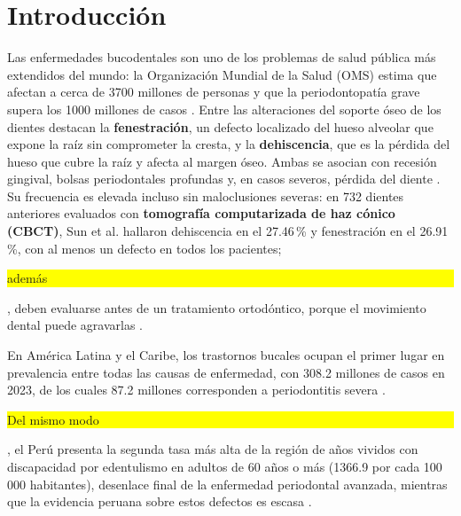 \documentclass[runningheads]{llncs}
\newcommand{\prob}[1]{\textcolor{problema}{\textbf{#1}}}
\newcommand{\dat}[1]{\textcolor{dataset}{\textbf{#1}}}
\newcommand{\con}[1]{{\setlength{\fboxsep}{0.5pt}\colorbox{yellow}{\strut #1}}}
\newcommand{\prob}[1]{#1}
\newcommand{\dat}[1]{#1}
\newcommand{\con}[1]{#1}
\begin{document}
\section{Introducción}

Las enfermedades bucodentales son uno de los problemas de salud pública
más extendidos del mundo: la Organización Mundial de la Salud (OMS) estima
que afectan a cerca de 3700 millones de personas y que la periodontopatía
grave supera los 1000 millones de casos \cite{oms2025saludbucodental}. Entre las alteraciones del soporte óseo de
los dientes destacan la \prob{fenestración}, un defecto localizado del
hueso alveolar que expone la raíz sin comprometer la cresta, y la
\prob{dehiscencia}, que es la pérdida del hueso que cubre la raíz y afecta
al margen óseo. Ambas se asocian con recesión gingival, bolsas
periodontales profundas y, en casos severos, pérdida del diente
\cite{liu2025fdtooth}. Su frecuencia es elevada incluso sin maloclusiones
severas: en 732 dientes anteriores evaluados con \dat{tomografía
computarizada de haz cónico (CBCT)}, Sun et al. hallaron dehiscencia en el
27.46\,\% y fenestración en el 26.91\,\%, con al menos un defecto en todos
los pacientes; \con{además}, deben evaluarse antes de un tratamiento
ortodóntico, porque el movimiento dental puede agravarlas
\cite{sun2022dehiscence}.

En América Latina y el Caribe, los trastornos bucales ocupan el primer
lugar en prevalencia entre todas las causas de enfermedad, con 308.2
millones de casos en 2023, de los cuales 87.2 millones corresponden a
periodontitis severa \cite{gbd2026latinoamerica}. \con{Del mismo modo}, el
Perú presenta la segunda tasa más alta de la región de años vividos con
discapacidad por edentulismo en adultos de 60 años o más (1366.9 por cada
100\,000 habitantes), desenlace final de la enfermedad periodontal
avanzada, mientras que la evidencia peruana sobre estos defectos es escasa
\cite{gbd2026latinoamerica}.
\end{document}
